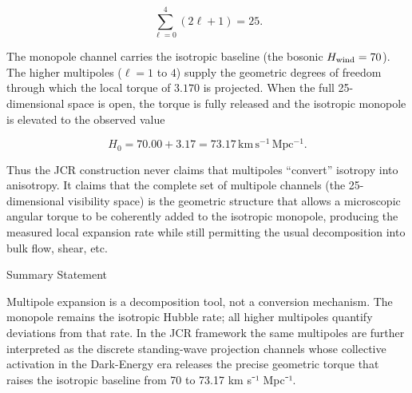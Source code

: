 \[
\sum_{\ell=0}^{4}(2\ell+1) = 25.
\]

The monopole channel carries the isotropic baseline (the bosonic \(H_{\rm wind}=70\)).  
The higher multipoles (\(\ell=1\) to \(4\)) supply the geometric degrees of freedom through which the local torque of \(3.170\) is projected.  
When the full 25-dimensional space is open, the torque is fully released and the isotropic monopole is elevated to the observed value

\[
H_0 = 70.00 + 3.17 = 73.17\,\mathrm{km\,s^{-1}\,Mpc^{-1}}.
\]

Thus the JCR construction never claims that multipoles “convert” isotropy into anisotropy.  
It claims that the complete set of multipole channels (the 25-dimensional visibility space) is the geometric structure that allows a microscopic angular torque to be coherently added to the isotropic monopole, producing the measured local expansion rate while still permitting the usual decomposition into bulk flow, shear, etc.

Summary Statement

Multipole expansion is a decomposition tool, not a conversion mechanism.  
The monopole remains the isotropic Hubble rate; all higher multipoles quantify deviations from that rate.  
In the JCR framework the same multipoles are further interpreted as the discrete standing-wave projection channels whose collective activation in the Dark-Energy era releases the precise geometric torque that raises the isotropic baseline from 70 to 73.17 km s⁻¹ Mpc⁻¹.
